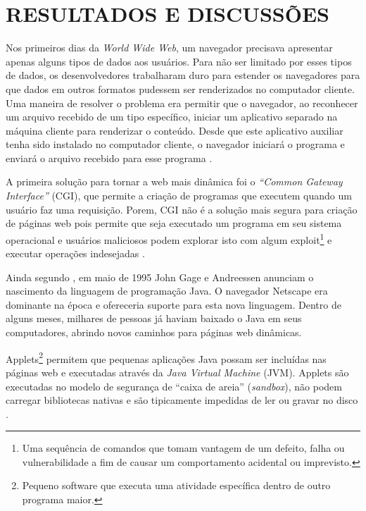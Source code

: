 \section{RESULTADOS E DISCUSSÕES}


Nos primeiros dias da \emph{World Wide Web}, um navegador precisava apresentar apenas alguns tipos de dados aos usuários. Para não ser limitado por esses tipos de dados, os desenvolvedores trabalharam duro para estender os navegadores para que dados em outros formatos pudessem ser renderizados no computador cliente. Uma maneira de resolver o problema era permitir que o navegador, ao reconhecer um arquivo recebido de um tipo específico, iniciar um aplicativo separado na máquina cliente para renderizar o conteúdo. Desde que este aplicativo auxiliar tenha sido instalado no computador cliente, o navegador iniciará o programa e enviará o arquivo recebido para esse programa \cite{zammetti2007brief}.

A primeira solução para tornar a web mais dinâmica foi o \emph{“Common Gateway Interface”} (CGI), que permite a criação de programas que executem quando um usuário faz uma requisição. Porem, CGI não é a solução mais segura para criação de páginas web pois permite que seja executado um programa em seu sistema operacional e usuários maliciosos podem explorar isto com algum exploit\footnote{Uma sequência de comandos que tomam vantagem de um defeito, falha ou vulnerabilidade a fim de causar um comportamento acidental ou imprevisto.} e executar operações indesejadas \cite{Asleson2006}.

Ainda segundo , em maio de 1995 John Gage e Andreessen anunciam o nascimento da linguagem de programação Java. O navegador Netscape era dominante na época e ofereceria suporte para esta nova linguagem. Dentro de alguns meses, milhares de pessoas já haviam baixado o Java em seus computadores, abrindo novos caminhos para páginas web dinâmicas.

Applets\footnote{Pequeno software que executa uma atividade específica dentro de outro programa maior.} permitem que pequenas aplicações Java possam ser incluídas nas páginas web e executadas através da \emph{Java Virtual Machine} (JVM). Applets são executadas no modelo de segurança de “caixa de areia” (\emph{sandbox}), não podem carregar bibliotecas nativas e são tipicamente impedidas de ler ou gravar no disco \cite{Asleson2006}.


